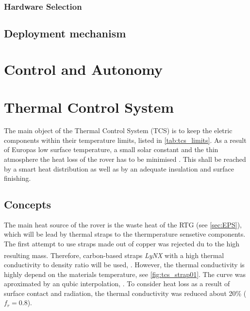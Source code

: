 \subsubsection*{Hardware Selection}
\label{sec:HardwareLoco}



\subsection{Deployment mechanism}

\section{Control and Autonomy} \label{sec:ControlandAutonomy}



\clearpage
\section{Thermal Control System} \label{sec:thermalcontrol}
The main object of the Thermal Control System (TCS) is to keep the eletric components within their temperature limits, listed in \autoref{tab:tcs_limits}.
As a result of Europas low surface temperature, a small solar constant and the thin atmosphere the heat loss of the rover has to be minimised  \cite{Europa}.
This shall be reached by a smart heat distribution as well as by an adequate insulation and surface finishing.

\subsection{Concepts}
The main heat source of the rover is the waste heat of the RTG (see \autoref{sec:EPS}), which will be lead by thermal straps to the thermperature sensetive components.
The first attempt to use straps made out of copper was rejected du to the high resulting mass.
Therefore, carbon-based straps \textit{LyNX}\textsuperscript{\tiny\textregistered} with a high thermal conductivity to density ratio will be used, \cite{ref_tcs_01}.
However, the thermal conductivity is highly depend on the materials temperature, see \autoref{fig:tcs_strap01}.
The curve was aproximated by an qubic interpolation, .
To consider heat loss as a result of surface contact and radiation, the thermal conductivity was reduced about 20\% ($f_{r}=0.8$).


